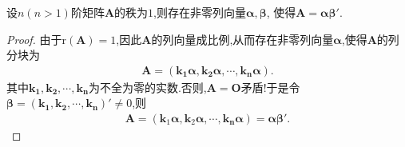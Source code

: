 \documentclass[../../main.tex]{subfiles}%
\begin{document}
\begin{lemma}[秩1矩阵的列向量分解]\label{lemma:秩1矩阵的列向量分解}
设\(n(n > 1)\)阶矩阵\(\boldsymbol{A}\)的秩为\(1\),则存在非零列向量\(\boldsymbol{\alpha},\boldsymbol{\beta}\), 使得\(\boldsymbol{A} = \boldsymbol{\alpha}\boldsymbol{\beta}'\).
\end{lemma}
\begin{proof}

由于$\mathrm{r}(\boldsymbol{A}) = 1$,因此$\boldsymbol{A}$的列向量成比例,从而存在非零列向量$\boldsymbol{\alpha }$,使得$\boldsymbol{A}$的列分块为
\begin{align*}
\boldsymbol{A}=\left( \boldsymbol{k}_{\mathbf{1}}\boldsymbol{\alpha },\boldsymbol{k}_{\mathbf{2}}\boldsymbol{\alpha },\cdots ,\boldsymbol{k}_{\boldsymbol{n}}\boldsymbol{\alpha } \right)  .
\end{align*}
其中$\boldsymbol{k}_{\mathbf{1}},\boldsymbol{k}_{\mathbf{2}},\cdots ,\boldsymbol{k}_{\boldsymbol{n}}$为不全为零的实数.否则,$\boldsymbol{A}=\boldsymbol{O}$矛盾!于是令$\boldsymbol{\beta }=\left( \boldsymbol{k}_{\mathbf{1}},\boldsymbol{k}_{\mathbf{2}},\cdots ,\boldsymbol{k}_{\boldsymbol{n}} \right)'\ne 0$,则
\begin{align*}
\boldsymbol{A}=\left( \boldsymbol{k}_1\boldsymbol{\alpha },\boldsymbol{k}_2\boldsymbol{\alpha },\cdots ,\boldsymbol{k}_{\boldsymbol{n}}\boldsymbol{\alpha } \right) =\boldsymbol{\alpha \beta }' .
\end{align*}

\end{proof}
\end{document}
